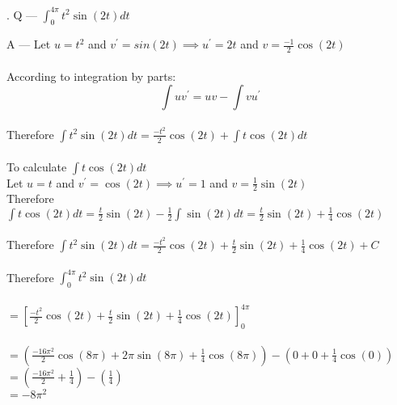 \documentclass{article}
\newcounter{question}
\begin{document}
\newcommand\Que[1]{%
   \leavevmode\par
   \stepcounter{question}
   \noindent
   \thequestion. Q --- #1\par}

\newcommand\Ans[2][]{%
    \leavevmode\par\noindent
   {A --- \textbf{#1}#2\par}}

\Que{ $ \int_{0}^{4\pi}{t^2\sin(2t)} dt $ }
\Ans
{
Let $ u = t^2 $ and $ v^{\prime} = sin(2t) 
\implies u^{\prime} = 2t $ and $ v = \frac{-1}{2}\cos(2t) $\\\\

According to integration by parts:\\
$$\int{uv^{\prime}}=uv-\int{vu^{\prime}}$$\\

Therefore $ \int{t^2\sin(2t)} dt 
= \frac{-t^2}{2}\cos(2t) + \int{ t\cos(2t) } dt $\\\\

To calculate $ \int{ t\cos(2t) } dt $\\

Let $ u = t $ and $ v^{\prime} = \cos(2t)
\implies u^{\prime} = 1 $ and $ v = \frac{1}{2}\sin(2t) $\\

Therefore $ \int{ t\cos(2t) } dt
= \frac{t}{2}\sin(2t) - \frac{1}{2}\int{ \sin(2t) } dt
= \frac{t}{2}\sin(2t) + \frac{1}{4}\cos(2t) $\\\\

Therefore $ \int{t^2\sin(2t)} dt 
= \frac{-t^2}{2}\cos(2t) + \frac{t}{2}\sin(2t) + \frac{1}{4}\cos(2t) + C $\\\\

Therefore $ \int_{0}^{4\pi}{t^2\sin(2t)} dt $\\\\

$ = \left[\frac{-t^2}{2}\cos(2t) + \frac{t}{2}\sin(2t) + \frac{1}{4}\cos(2t) \right]_{0}^{4\pi} $\\\\

$ = (
      \frac{-16\pi^2}{2}\cos(8\pi)
      + 2\pi\sin(8\pi)
      + \frac{1}{4}\cos(8\pi)
   ) - (
      0 + 0 + \frac{1}{4}\cos(0)
   ) $\\

$ = (\frac{-16\pi^2}{2} + \frac{1}{4}) 
- (\frac{1}{4}) $\\

$ = -8\pi^2 $\\

}
\end{document}
